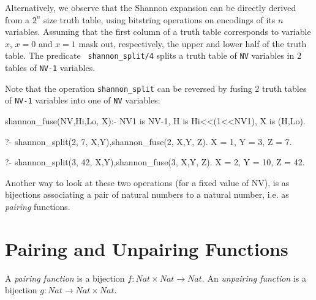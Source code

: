 \documentclass[]{INCLUDES/llncs}
\begin{document}
Alternatively, we observe that the Shannon expansion
can be directly derived from a $2^n$ size truth table, 
using bitstring operations on encodings of its $n$ variables.
Assuming that the first column of a truth table corresponds to 
variable $x$, $x=0$ and $x=1$ mask out, respectively, 
the upper and lower half of the truth table. The predicate {\tt
shannon\_split/4} splits a truth table of {\tt NV} variables in 2 tables of
{\tt NV-1} variables.
Note that the operation {\tt shannon\_split} can be reversed by fusing 2 truth
tables of {\tt NV-1} variables into one of {\tt NV} variables:
\begin{code}
shannon_fuse(NV,Hi,Lo, X):-
  NV1 is NV-1,
  H is Hi<<(1<<NV1),
  X is \/(H,Lo).
\end{code}
\begin{codex}
?- shannon_split(2, 7, X,Y),shannon_fuse(2, X,Y, Z).
X = 1,
Y = 3,
Z = 7.

?- shannon_split(3, 42, X,Y),shannon_fuse(3, X,Y, Z).
X = 2,
Y = 10,
Z = 42.
\end{codex}

Another way to look at these two operations (for a fixed value of NV), is
as bijections associating a pair of natural numbers to a 
natural number, i.e. as {\em pairing} functions.
\begin{comment}
\begin{code}
shannon_tree(NV,TT, st(NV,BDD)):-
  Max is (1<<(1<<NV)),
  TT<Max,
  shannon_unfold(NV,NV,TT, BDD).

shannon_unfold(0,_,TT,c(TT)).
shannon_unfold(N,NV,TT,mux(X,H,L)):-N>0,
  N1 is N-1,
  X is NV-N,
  shannon_split(N,TT,Hi,Lo),
  shannon_unfold(N1,NV,Hi,H),
  shannon_unfold(N1,NV,Lo,L).
\end{code}
\end{comment}
\section{Pairing and Unpairing Functions} \label{pairings}

\begin{df}
A {\em pairing function} is a bijection $f : Nat \times Nat \rightarrow
Nat$. An {\em unpairing function} is a bijection $g : Nat \rightarrow
Nat  \times Nat$.
\end{df}
\end{document}
